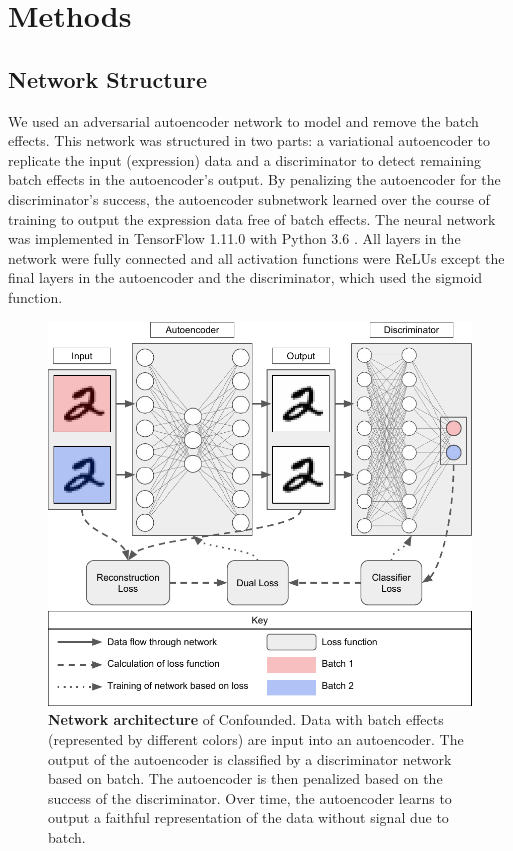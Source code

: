 \documentclass[notitlepage]{article}
\begin{document}
\section{Methods} \label{sec:methods}

\subsection{Network Structure}

We used an adversarial autoencoder network to model and remove the batch effects.
This network was structured in two parts: a variational autoencoder \cite{louizos_variational_2015} to replicate the input (expression) data and a discriminator to detect remaining batch effects in the autoencoder's output.
By penalizing the autoencoder for the discriminator's success, the autoencoder subnetwork learned over the course of training to output the expression data free of batch effects.
The neural network was implemented in TensorFlow 1.11.0 \cite{abadi_tensorflow_2015} with Python 3.6 \cite{python_software_foundation_python_2019}.
All layers in the network were fully connected and all activation functions were ReLUs \cite{agarap_deep_2018} except the final layers in the autoencoder and the discriminator, which used the sigmoid function.

\begin{figure}
	\centering
	\includegraphics[width=\columnwidth]{figures/final/network}
	\caption{\textbf{Network architecture} of Confounded.
	Data with batch effects (represented by different colors) are input into an autoencoder.
	The output of the autoencoder is classified by a discriminator network based on batch.
	The autoencoder is then penalized based on the success of the discriminator.
	Over time, the autoencoder learns to output a faithful representation of the data without signal due to batch.}
	\label{fig:network}
\end{figure}
\end{document}
